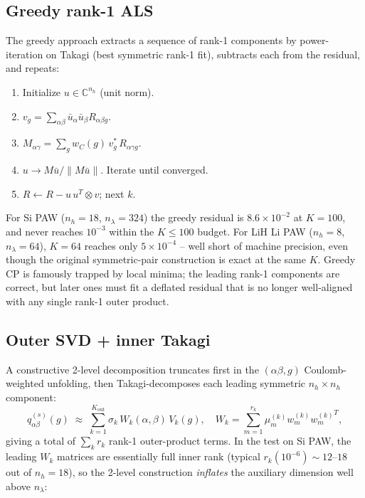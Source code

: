 \documentclass[aps,prb,reprint,superscriptaddress,nofootinbib]{revtex4-2}
\begin{document}
\subsection{Greedy rank-1 ALS}

The greedy approach extracts a sequence of rank-1 components by
power-iteration on Takagi (best symmetric rank-1 fit), subtracts each
from the residual, and repeats:
\begin{enumerate}
\item Initialize \(u\in\mathbb C^{n_h}\) (unit norm).
\item \(v_g=\sum_{\alpha\beta}\bar u_\alpha\bar u_\beta R_{\alpha\beta g}\).
\item \(M_{\alpha\gamma}=\sum_g w_C(g)\,v_g^{*}\,R_{\alpha\gamma g}\).
\item \(u\to M\bar u/\|M\bar u\|\).  Iterate until converged.
\item \(R\gets R-u\,u^{T}\otimes v\); next \(k\).
\end{enumerate}
For Si PAW (\(n_h=18\), \(n_\lambda=324\)) the greedy residual is
\(8.6\times 10^{-2}\) at \(K=100\), and never reaches \(10^{-3}\)
within the \(K\le 100\) budget.  For LiH Li PAW (\(n_h=8\),
\(n_\lambda=64\)), \(K=64\) reaches only \(5\times 10^{-4}\) -- well
short of machine precision, even though the original symmetric-pair
construction is exact at the same \(K\).  Greedy CP is famously
trapped by local minima; the leading rank-1 components are correct,
but later ones must fit a deflated residual that is no longer
well-aligned with any single rank-1 outer product.

\subsection{Outer SVD + inner Takagi}

A constructive 2-level decomposition truncates first in the
\((\alpha\beta,g)\) Coulomb-weighted unfolding, then Takagi-decomposes
each leading symmetric \(n_h\times n_h\) component:
\begin{equation}
q^{(s)}_{\alpha\beta}(g)\;\approx\;
\sum_{k=1}^{K_{\text{out}}}\sigma_k\,W_k(\alpha,\beta)\,V_k(g),
\quad
W_k=\sum_{m=1}^{r_k}\mu_m^{(k)}w_m^{(k)}{w_m^{(k)}}^{T},
\label{eq:outer-inner}
\end{equation}
giving a total of \(\sum_k r_k\) rank-1 outer-product terms.  In the
test on Si PAW, the leading \(W_k\) matrices are essentially full
inner rank (typical \(r_k(10^{-6})\!\sim\!12\text{--}18\) out of
\(n_h=18\)), so the 2-level construction \emph{inflates} the
auxiliary dimension well above \(n_\lambda\):
\end{document}
